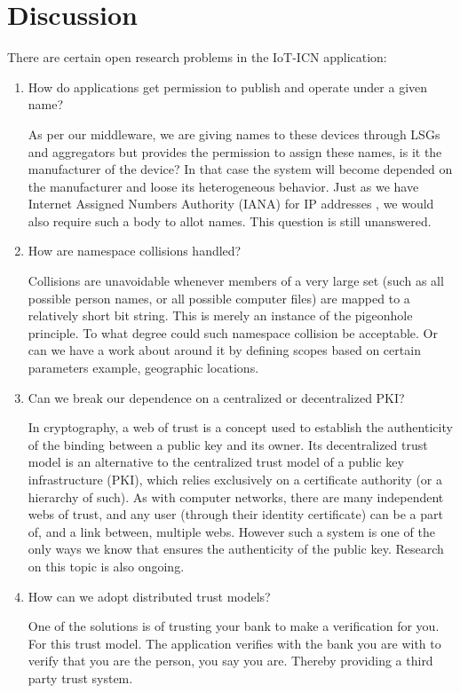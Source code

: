\section{Discussion}
\label{sec:discussion}
There are certain open research problems in the IoT-ICN application:
\begin{enumerate}
\item How do applications get permission to publish and operate under a given name?\par
As per our middleware, we are giving names to these devices through LSGs and aggregators but provides the permission to assign these names, is it the manufacturer of the device? In that case the system will become depended on the manufacturer and loose its heterogeneous behavior. Just as we have Internet Assigned Numbers Authority (IANA) for IP addresses , we would also require such a body to allot names. This question is still unanswered.
\item How are namespace collisions handled? \par
Collisions are unavoidable whenever members of a very large set (such as all possible person names, or all possible computer files) are mapped to a relatively short bit string. This is merely an instance of the pigeonhole principle. To what degree could such namespace collision be acceptable. Or can we have a work about around it by defining scopes based on certain parameters example, geographic locations.
\item Can we break our dependence on a centralized or decentralized PKI? \par
In cryptography, a web of trust is a concept used to establish the authenticity of the binding between a public key and its owner. Its decentralized trust model is an alternative to the centralized trust model of a public key infrastructure (PKI), which relies exclusively on a certificate authority (or a hierarchy of such). As with computer networks, there are many independent webs of trust, and any user (through their identity certificate) can be a part of, and a link between, multiple webs. However such a system is one of the only ways we know that ensures the authenticity of the public key. Research on this topic is also ongoing.
\item How can we adopt distributed trust models? \par
One of the solutions is of trusting your bank to make a verification for you. For this trust model. The application verifies with the bank you are with to verify that you are the person, you say you are. Thereby providing a third party trust system.

\end{enumerate}
